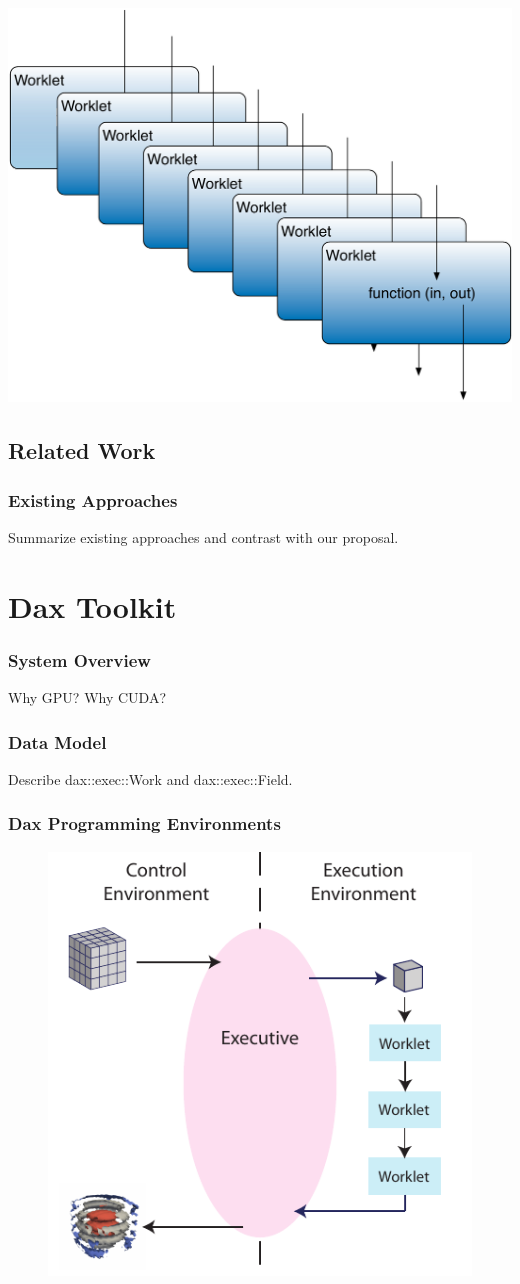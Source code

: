 \documentclass[brown]{beamer}
\begin{document}
\frame
{
  \begin{center}
  \includegraphics[width=\textwidth]{images/many_worklets.pdf}
  \end{center}
}

\subsection{Related Work}
\frame
{
  \frametitle{Existing Approaches}
  Summarize existing approaches and contrast with our proposal.
}

\section{Dax Toolkit}

\frame
{
  \frametitle{System Overview}
  Why GPU? Why CUDA?
}

\frame
{
  \frametitle{Data Model}
  Describe dax::exec::Work and dax::exec::Field.
}

\frame
{
  \frametitle{Dax Programming Environments}
  \begin{figure}[htbp]
    \centering
    \includegraphics{images/DaxDiagram}
  \end{figure}
}
\end{document}
